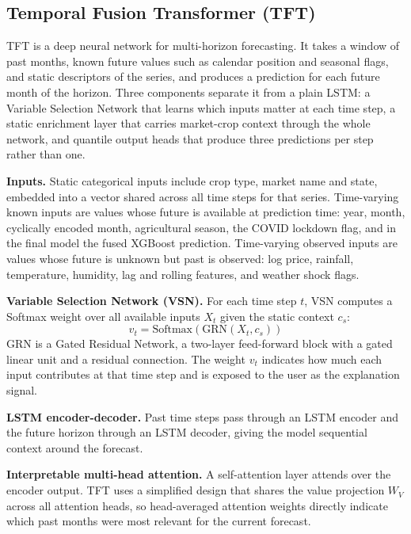 \documentclass[conference,twoside]{IEEEtran}
\begin{document}
\subsection{Temporal Fusion Transformer (TFT)}
TFT \cite{lim2021tft} is a deep neural network for multi-horizon forecasting. It takes a window of past months, known future values such as calendar position and seasonal flags, and static descriptors of the series, and produces a prediction for each future month of the horizon. Three components separate it from a plain LSTM: a Variable Selection Network that learns which inputs matter at each time step, a static enrichment layer that carries market-crop context through the whole network, and quantile output heads that produce three predictions per step rather than one.

\textbf{Inputs.} Static categorical inputs include crop type, market name and state, embedded into a vector shared across all time steps for that series. Time-varying known inputs are values whose future is available at prediction time: year, month, cyclically encoded month, agricultural season, the COVID lockdown flag, and in the final model the fused XGBoost prediction. Time-varying observed inputs are values whose future is unknown but past is observed: log price, rainfall, temperature, humidity, lag and rolling features, and weather shock flags.

\textbf{Variable Selection Network (VSN).} For each time step $t$, VSN computes a Softmax weight over all available inputs $X_t$ given the static context $c_s$:
\begin{equation}
v_t = \mathrm{Softmax}\!\left( \mathrm{GRN}(X_t, c_s) \right)
\label{eq:vsn}
\end{equation}
GRN is a Gated Residual Network, a two-layer feed-forward block with a gated linear unit and a residual connection. The weight $v_t$ indicates how much each input contributes at that time step and is exposed to the user as the explanation signal.

\textbf{LSTM encoder-decoder.} Past time steps pass through an LSTM encoder and the future horizon through an LSTM decoder, giving the model sequential context around the forecast.

\textbf{Interpretable multi-head attention.} A self-attention layer attends over the encoder output. TFT uses a simplified design that shares the value projection $W_V$ across all attention heads, so head-averaged attention weights directly indicate which past months were most relevant for the current forecast.
\end{document}
